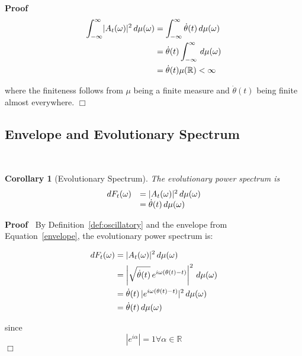 \documentclass{article}
\newenvironment{proof}{\noindent\textbf{Proof\ }}{\hspace*{\fill}$\Box$\medskip}
\newtheorem{corollary}{Corollary}
\begin{document}
\begin{proof}
  \begin{align}
    \int_{- \infty}^{\infty} \lvert A_t (\omega) \rvert^2  \hspace{0.17em} d
    \mu (\omega) & = \int_{- \infty}^{\infty} \dot{\theta} (t) 
    \hspace{0.17em} d \mu (\omega) \\
    & = \dot{\theta} (t) \int_{- \infty}^{\infty}  \hspace{0.17em} d \mu
    (\omega) \nonumber\\
    & = \dot{\theta} (t) \mu (\mathbb{R}) < \infty 
  \end{align}
  
  where the finiteness follows from $\mu$ being a finite measure and
  $\dot{\theta} (t)$ being finite almost everywhere.
\end{proof}

\subsection{Envelope and Evolutionary Spectrum}

\

\begin{corollary}
  [Evolutionary Spectrum]\label{cor:evolving_spec} The evolutionary power
  spectrum is
  \begin{equation}
    \label{eq:evolutionary_spec} \begin{array}{ll}
      dF_t (\omega) & = \lvert A_t (\omega) \rvert^2  \hspace{0.17em} d \mu
      (\omega)\\
      & = \dot{\theta} (t)  \hspace{0.17em} d \mu (\omega)
    \end{array}
  \end{equation}
\end{corollary}

\begin{proof}
  By Definition~\ref{def:oscillatory} and the envelope from
  Equation~\ref{envelope}, the evolutionary power spectrum is:
  
  \begin{align}
    dF_t (\omega) & = \lvert A_t (\omega) \rvert^2  \hspace{0.17em} d \mu
    (\omega) \\
    & = \left| \sqrt{\dot{\theta} (t)}  \hspace{0.17em} e^{i \omega (\theta
    (t) - t)} \right|^2  \hspace{0.17em} d \mu (\omega) \\
    & = \dot{\theta} (t) \hspace{0.17em} | e^{i \omega (\theta (t) - t)} |^2 
    \hspace{0.17em} d \mu (\omega) \\
    & = \dot{\theta} (t)  \hspace{0.17em} d \mu (\omega) 
  \end{align}
  
  since
  \begin{equation}
    |e^{i \alpha} | = 1 \forall \alpha \in \mathbb{R}
  \end{equation}
\end{proof}
\end{document}
